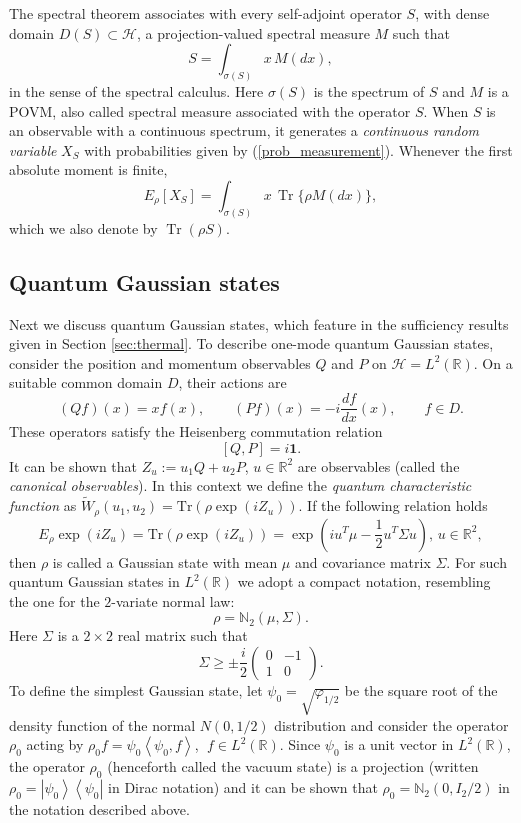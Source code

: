 \documentclass{article}
\theoremstyle{named}
\theoremstyle{named1}
\newcommand{\Tr}{\operatorname{Tr}}
\theoremstyle{plain}
\theoremstyle{remark}
\begin{document}
The spectral theorem associates with every self-adjoint operator $S$,
with dense domain $D(S)\subset\mathcal H$, a projection-valued spectral
measure $M$ such that
\[
    S=\int_{\sigma(S)}x\,M(dx),
\]
in the sense of the spectral calculus. Here $\sigma(S)$ is the spectrum of $S$ and $M$ is a POVM, also called spectral measure associated with the operator $S$. When $S$ is an observable with a continuous spectrum, it generates a \textit{continuous random variable} $X_S$ with probabilities given by (\ref{prob_measurement}). 
Whenever the first absolute moment is finite,
\[
    E_\rho[X_S]
    =
    \int_{\sigma(S)} x\,\Tr\{\rho M(dx)\},
\]
which we also denote by $\Tr(\rho S)$.

\subsection{Quantum Gaussian states}
\label{subsec:gaussian-states}

Next we discuss quantum Gaussian states, which feature in the sufficiency results given in Section \ref{sec:thermal}. To describe one-mode quantum Gaussian states, consider the position
and momentum observables $Q$ and $P$ on
$\mathcal H=L^2(\mathbb R)$. On a suitable common domain $D$,
their actions are
\[
    (Qf)(x)=xf(x),
    \qquad
    (Pf)(x)=-i\frac{df}{dx}(x),
    \qquad f\in D.
\]
These operators satisfy the Heisenberg commutation relation
$$[Q,P]=i\textbf{1}.$$
It can be shown that $Z_{u}:=u_{1}Q+u_{2}P$, $u\in\mathbb{R}^{2}$ are
observables (called the \textit{canonical observables}). In this context we define the \textit{quantum characteristic function} as $\tilde{W}_{\rho}(u_1,u_2)=\mathrm{Tr}(\rho\exp\left(  iZ_{u}\right))$.
 If the following relation holds
\[
E_{\rho}\exp\left(  iZ_{u}\right)  =\mathrm{Tr}(\rho\exp\left(  iZ_{u}\right))=\exp\left(  iu^{T}\mu-\frac{1}%
{2}u^{T}\Sigma u\right)  \text{, }u\in\mathbb{R}^{2},
\]
 then $\rho$ is called a Gaussian state with mean $\mu$ and covariance matrix $\Sigma$.
 For such quantum Gaussian states in $L^{2}\left(  \mathbb{R}\right)  $ we
adopt a compact notation, resembling the one for the
$2$-variate normal law:
\begin{equation}
\rho=\mathbb{N}_{2}\left(  \mu,\Sigma\right)  . \label{notation-q-Gauss}%
\end{equation}
Here $\Sigma$ is a $2\times 2$ real matrix such that
$$\Sigma\geq \pm \frac{i}{2} \left(\begin{array}{cc}
    0 &  -1\\
     1& 0
\end{array}\right).$$
To define the simplest
Gaussian state, let $\psi_{0}=\sqrt{\varphi_{1/2}}$ be the square root of the
density function of the normal $N\left(  0,1/2\right)  $ distribution and
consider the operator $\rho_0$ acting by $\rho_0 f=\psi_{0}\left\langle \psi
_{0},f\right\rangle $, $\;f\in L^{2}\left(  \mathbb{R}\right)  $. Since
$\psi_{0}$ is a unit vector in $L^{2}\left(  \mathbb{R}\right)  $, the
operator $\rho_0$ (henceforth called the vacuum state) is a projection (written $\rho_0=\left\vert \psi_{0}%
\right\rangle \left\langle \psi_{0}\right\vert $ in Dirac notation) and it can be
shown that $\rho_0=\mathbb{N}_{2}\left(  0,I_2/2\right)$ in the notation described above.
\end{document}
